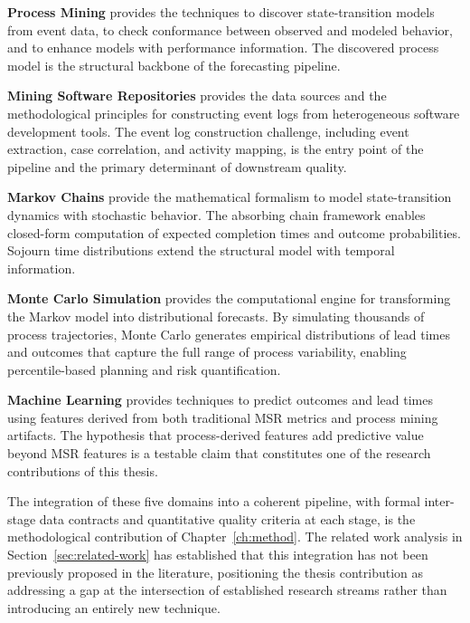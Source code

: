 \textbf{Process Mining} provides the techniques to discover
state-transition models from event data, to check conformance between
observed and modeled behavior, and to enhance models with performance
information. The discovered process model is the structural backbone of
the forecasting pipeline.

\textbf{Mining Software Repositories} provides the data sources and the
methodological principles for constructing event logs from heterogeneous
software development tools. The event log construction challenge, including
event extraction, case correlation, and activity mapping, is the entry
point of the pipeline and the primary determinant of downstream quality.

\textbf{Markov Chains} provide the mathematical formalism to model
state-transition dynamics with stochastic behavior. The absorbing chain
framework enables closed-form computation of expected completion times
and outcome probabilities. Sojourn time distributions extend the
structural model with temporal information.

\textbf{Monte Carlo Simulation} provides the computational engine for
transforming the Markov model into distributional forecasts. By simulating
thousands of process trajectories, Monte Carlo generates empirical
distributions of lead times and outcomes that capture the full range of
process variability, enabling percentile-based planning and risk
quantification.

\textbf{Machine Learning} provides techniques to predict outcomes and lead
times using features derived from both traditional MSR metrics and
process mining artifacts. The hypothesis that process-derived features
add predictive value beyond MSR features is a testable claim that
constitutes one of the research contributions of this thesis.

The integration of these five domains into a coherent pipeline, with
formal inter-stage data contracts and quantitative quality criteria at
each stage, is the methodological contribution of Chapter~\ref{ch:method}.
The related work analysis in Section~\ref{sec:related-work} has
established that this integration has not been previously proposed in
the literature, positioning the thesis contribution as addressing a gap
at the intersection of established research streams rather than
introducing an entirely new technique.

